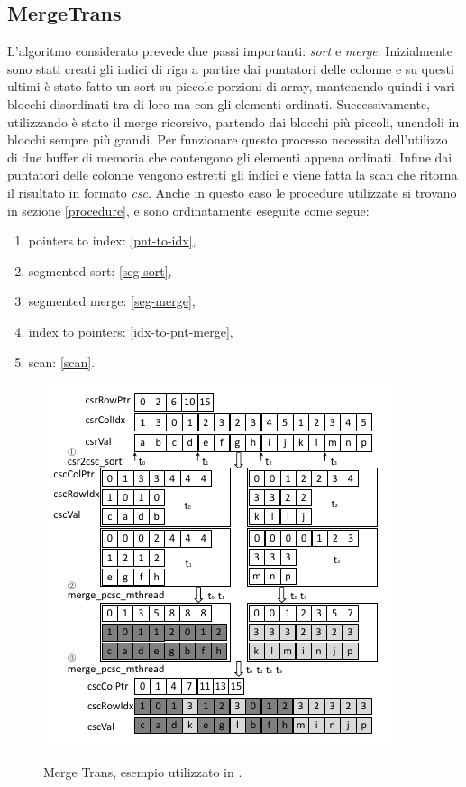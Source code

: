 \documentclass[]{IEEEtran}
\begin{document}
	\subsection{MergeTrans}
	L'algoritmo considerato prevede due passi importanti: \textit{sort} e \textit{merge}.
	Inizialmente sono stati creati gli indici di riga a partire dai puntatori delle colonne e su questi ultimi è stato fatto un sort su piccole porzioni di array, mantenendo quindi i vari blocchi disordinati tra di loro ma con gli elementi ordinati. Successivamente, utilizzando è stato il merge ricorsivo, partendo dai blocchi più piccoli, unendoli in blocchi sempre più grandi. Per funzionare questo processo necessita dell'utilizzo di due buffer di memoria che contengono gli elementi appena ordinati. Infine dai puntatori delle colonne vengono estretti gli indici e viene fatta la scan che ritorna il risultato in formato \textit{csc}. \newline
	Anche in questo caso le procedure utilizzate si trovano in sezione \ref{procedure}, e sono ordinatamente eseguite come segue:
	\begin{enumerate}
		\item pointers to index: \ref{pnt-to-idx},
		\item segmented sort: \ref{seg-sort},
		\item segmented merge: \ref{seg-merge},
		\item index to pointers: \ref{idx-to-pnt-merge},
		\item scan: \ref{scan}.
	\end{enumerate}
	
	\begin{figure}[H]
		\includegraphics[scale=0.8]{mergetrans.png}
		\label{mergetrans}
		\caption{Merge Trans, esempio utilizzato in \cite{parallelTrans}.}
	\end{figure}
	
\end{document}
